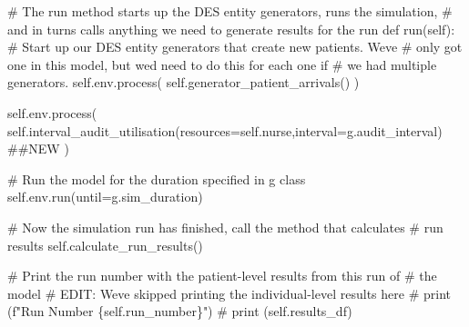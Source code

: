 \documentclass[
  letterpaper,
  DIV=11,
  numbers=noendperiod]{scrreprt}
\newenvironment{Shaded}{}{}
\newcommand{\CommentTok}[1]{\textcolor[rgb]{0.42,0.45,0.49}{#1}}
\newcommand{\KeywordTok}[1]{\textcolor[rgb]{0.84,0.23,0.29}{#1}}
\newcommand{\NormalTok}[1]{\textcolor[rgb]{0.14,0.16,0.18}{#1}}
\newcommand{\OperatorTok}[1]{\textcolor[rgb]{0.14,0.16,0.18}{#1}}
\newcommand{\VariableTok}[1]{\textcolor[rgb]{0.89,0.38,0.04}{#1}}
\begin{document}
\begin{Shaded}
\begin{Highlighting}[]
    \CommentTok{\# The run method starts up the DES entity generators, runs the simulation,}
    \CommentTok{\# and in turns calls anything we need to generate results for the run}
        \KeywordTok{def}\NormalTok{ run(}\VariableTok{self}\NormalTok{):}
        \CommentTok{\# Start up our DES entity generators that create new patients.  We\textquotesingle{}ve}
        \CommentTok{\# only got one in this model, but we\textquotesingle{}d need to do this for each one if}
        \CommentTok{\# we had multiple generators.}
        \VariableTok{self}\NormalTok{.env.process(}
          \VariableTok{self}\NormalTok{.generator\_patient\_arrivals()}
\NormalTok{        )}

        \VariableTok{self}\NormalTok{.env.process(}
          \VariableTok{self}\NormalTok{.interval\_audit\_utilisation(resources}\OperatorTok{=}\VariableTok{self}\NormalTok{.nurse,interval}\OperatorTok{=}\NormalTok{g.audit\_interval) }\CommentTok{\#\#NEW}
\NormalTok{        )}

        \CommentTok{\# Run the model for the duration specified in g class}
        \VariableTok{self}\NormalTok{.env.run(until}\OperatorTok{=}\NormalTok{g.sim\_duration)}

        \CommentTok{\# Now the simulation run has finished, call the method that calculates}
        \CommentTok{\# run results}
        \VariableTok{self}\NormalTok{.calculate\_run\_results()}

        \CommentTok{\# Print the run number with the patient{-}level results from this run of}
        \CommentTok{\# the model}
        \CommentTok{\# EDIT: We\textquotesingle{}ve skipped printing the individual{-}level results here}
        \CommentTok{\# print (f"Run Number \{self.run\_number\}")}
        \CommentTok{\# print (self.results\_df)}
\end{Highlighting}
\end{Shaded}
\end{document}
